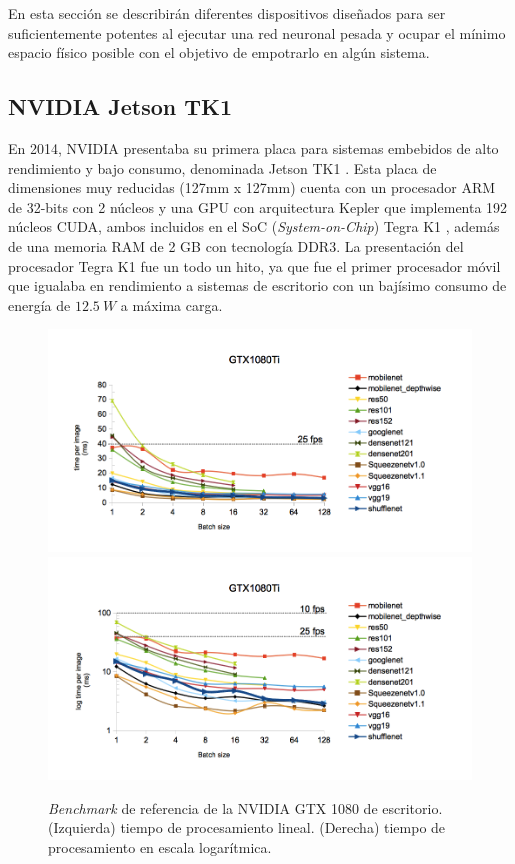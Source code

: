 En esta sección se describirán diferentes dispositivos diseñados para ser suficientemente potentes al ejecutar una red neuronal pesada y ocupar el mínimo espacio físico posible con el objetivo de empotrarlo en algún sistema.

\subsection{NVIDIA Jetson TK1}

En 2014, NVIDIA presentaba su primera placa para sistemas embebidos de alto rendimiento y bajo consumo, denominada Jetson TK1 \cite{jetsontk1}. Esta placa de dimensiones muy reducidas (127mm x 127mm) cuenta con un procesador ARM de 32-bits con 2 núcleos y una GPU con arquitectura Kepler que implementa 192 núcleos CUDA, ambos incluidos en el SoC (\textit{System-on-Chip}) Tegra K1 \cite{tegrak1}, además de una memoria RAM de 2 GB con tecnología DDR3. La presentación del procesador Tegra K1 fue un todo un hito, ya que fue el primer procesador móvil que igualaba en rendimiento a sistemas de escritorio con un bajísimo consumo de energía de $12.5\ W$ a máxima carga. 

\begin{figure}[htp]
    \centering
    \captionsetup{justification=centering}
    \includegraphics[width=.5\textwidth]{img/gtx1080_linear.png}\hfill
    \includegraphics[width=.5\textwidth]{img/gtx1080_log.png}
    \caption{\textit{Benchmark} de referencia de la NVIDIA GTX 1080 de escritorio. (Izquierda) tiempo de procesamiento lineal. (Derecha) tiempo de procesamiento en escala logarítmica.}
    \label{fig:ben_gtx}
\end{figure}

